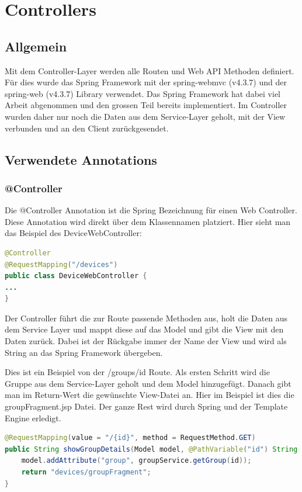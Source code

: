 \newpage

\section{Controllers}
\subsection{Allgemein}
Mit dem Controller-Layer werden alle Routen und Web API Methoden definiert. Für dies wurde das Spring Framework mit der spring-webmvc (v4.3.7) und der spring-web (v4.3.7) Library verwendet. Das Spring Framework hat dabei viel Arbeit abgenommen und den grossen Teil bereits implementiert. Im Controller wurden daher nur noch die Daten aus dem Service-Layer geholt, mit der View verbunden und an den Client zurückgesendet.

\subsection{Verwendete Annotations}
\subsubsection{@Controller}
Die @Controller Annotation ist die Spring Bezeichnung für einen Web Controller. Diese Annotation wird direkt über dem Klassennamen platziert. Hier sieht man das Beispiel des DeviceWebController:
\begin{lstlisting}[language=java]
@Controller
@RequestMapping("/devices")
public class DeviceWebController {
...
}
\end{lstlisting}

Der Controller führt die zur Route passende Methoden aus, holt die Daten aus dem Service Layer und mappt diese auf das Model und gibt die View mit den Daten zurück. Dabei ist der Rückgabe immer der Name der View und wird als String an das Spring Framework übergeben.

Dies ist ein Beispiel von der /groups/id Route. Als ersten Schritt wird die Gruppe aus dem Service-Layer geholt und dem Model hinzugefügt. Danach gibt man im Return-Wert die gewünschte View-Datei an. Hier im Beispiel ist dies die groupFragment.jsp Datei. Der ganze Rest wird durch Spring und der Template Engine erledigt.
\begin{lstlisting}[language=java]
@RequestMapping(value = "/{id}", method = RequestMethod.GET)
public String showGroupDetails(Model model, @PathVariable("id") String id) {
	model.addAttribute("group", groupService.getGroup(id));
	return "devices/groupFragment";
}
\end{lstlisting}
